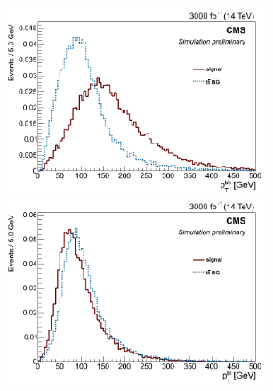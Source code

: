 \documentclass[10pt,a4paper]{article}
\newcommand{\ww}{7.7cm} %
\begin{document}
\begin{figure}[h]
	
  \begin{subfigure}[b]{17cm}
    \begin{minipage}[h!]{\ww}
      \centering
      \includegraphics[width=\ww]{figs/Pt_bb.png}
    \end{minipage}
    \begin{minipage}[h!]{\ww}
      \centering
      \includegraphics[width=\ww]{figs/Pt_bl.png}
    \end{minipage}
  \end{subfigure}


\end{figure}
\end{document}
